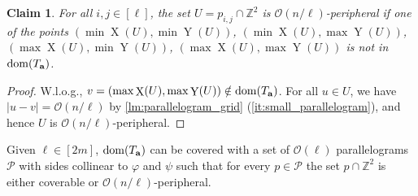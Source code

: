\documentclass[twoside,leqno]{article}
\newtheorem{claim}{Claim}[section]
\newcommand{\Z}{\mathbb{Z}}
\renewcommand{\O}{\mathcal{O}}
\newcommand{\Ta}{T_\mathbf{a}}
\renewcommand{\phi}{\varphi}
\DeclareMathOperator*{\X}{X}
\DeclareMathOperator*{\Y}{Y}
\newcommand{\absolute}[1]{\left\lvert#1\right\rvert}
\begin{document}
\begin{claim}\label{peripheral}
For all $i,j \in [\ell]$, the set $U = p_{i,j} \cap \Z^2$ is $\O(n / \ell)$-peripheral if one of the points $(\min \X(U), \min \Y(U))$, $(\min \X(U), \max \Y(U))$, $(\max \X(U), \min \Y(U))$, $(\max \X(U), \max \Y(U))$ is not in $\d{\Ta}$.
\end{claim}
\begin{proof}
W.l.o.g., $v = (\max \X(U), \max \Y(U)) \notin \d{\Ta}$. For all $u \in U$, we have $\absolute{u-v} = \O(n / \ell)$ by \cref{lm:parallelogram_grid} (\ref{it:small_parallelogram}), and hence $U$ is $\O(n / \ell)$-peripheral.
\end{proof}

\begin{lemma}\label{lm:parallelogram_merge}
Given $\ell \in [2m]$, $\d{\Ta}$ can be covered with a set of $\O(\ell)$ parallelograms $\mathcal{P}$ with sides collinear to $\phi$ and $\psi$ such that for every $p \in \mathcal{P}$ the set $p \cap \Z^2$ is either coverable or $\O(n / \ell)$-peripheral. 
\end{lemma}
\end{document}
